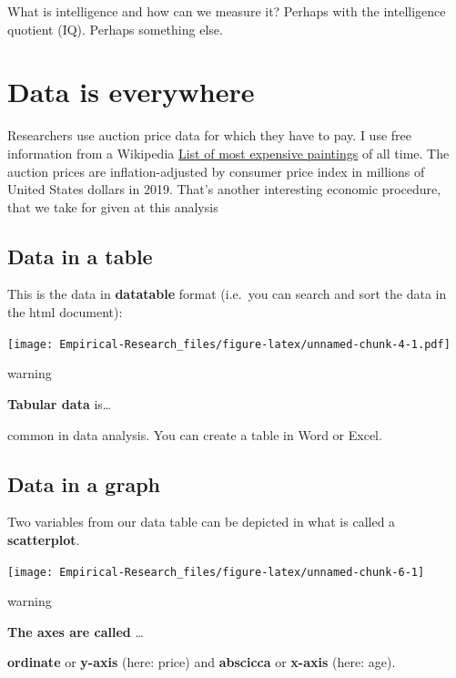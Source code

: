\documentclass[
]{book}
\begin{document}
What is intelligence and how can we measure it? Perhaps with the intelligence quotient (IQ). Perhaps something else.

\hypertarget{data-is-everywhere}{%
\section{Data is everywhere}\label{data-is-everywhere}}

Researchers use auction price data for which they have to pay. I use free information from a Wikipedia \href{https://en.wikipedia.org/wiki/List_of_most_expensive_paintings}{List of most expensive paintings} of all time. The auction prices are inflation-adjusted by consumer price index in millions of United States dollars in 2019. That's another interesting economic procedure, that we take for given at this analysis

\hypertarget{data-in-a-table}{%
\subsection{Data in a table}\label{data-in-a-table}}

This is the data in \textbf{datatable} format (i.e.~you can search and sort the data in the html document):

\texttt{[image: Empirical-Research\_files/figure-latex/unnamed-chunk-4-1.pdf]}

\begin{infobox}warning

\textbf{Tabular data} is\ldots{}

common in data analysis. You can create a table in Word or Excel.

\end{infobox}

\hypertarget{data-in-a-graph}{%
\subsection{Data in a graph}\label{data-in-a-graph}}

Two variables from our data table can be depicted in what is called a \textbf{scatterplot}.

\begin{center}\texttt{[image: Empirical-Research\_files/figure-latex/unnamed-chunk-6-1]} \end{center}

\begin{infobox}warning

\textbf{The axes are called} \ldots{}

\textbf{ordinate} or \textbf{y-axis} (here: price) and \textbf{abscicca} or \textbf{x-axis} (here: age).

\end{infobox}
\end{document}
